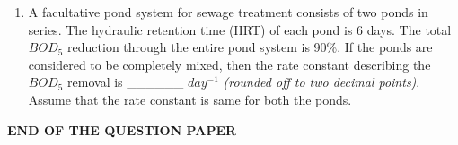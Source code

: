 \documentclass[journal]{IEEEtran}
\begin{document}
\begin{enumerate}[start=1]
\item A facultative pond system for sewage treatment consists of two ponds in series. The hydraulic retention time (HRT) of each pond is 6 days. The total $BOD_5$ reduction through the entire pond system is 90\%. If the ponds are considered to be completely mixed, then the rate constant describing the $BOD_5$ removal is \_\_\_\_\_\_ $day^{-1}$ \textit{(rounded off to two decimal points)}. Assume that the rate constant is same for both the ponds. \hfill{}

\end{enumerate}
\bigskip
\begin{center}
    \textbf{END OF THE QUESTION PAPER}
\end{center}
\end{document}
